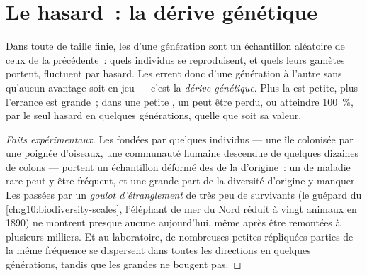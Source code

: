 \section{Le hasard~: la dérive génétique}

\begin{proposition}\label{prop:g12:selection-drift-speciation:drift}
Dans toute  de taille finie, les  d'une génération
sont un échantillon aléatoire de ceux de la précédente~: quels
individus se reproduisent, et quels  leurs gamètes portent,
fluctuent par hasard. Les  errent donc d'une
génération à l'autre sans qu'aucun avantage soit en jeu --- c'est la
\emph{dérive génétique}. Plus la  est
petite, plus l'errance est grande~; dans une petite , un
 peut être perdu, ou atteindre 100~\%, par le seul hasard en
quelques générations, quelle que soit sa valeur.
\end{proposition}
\begin{proof}[Faits expérimentaux]
Les  fondées par quelques individus --- une île colonisée
par une poignée d'oiseaux, une communauté humaine descendue de quelques
dizaines de colons --- portent un échantillon déformé des  de la
 d'origine~: un  de maladie rare peut y être fréquent,
et une grande part de la diversité d'origine y manquer. Les 
passées par un \emph{goulot d'étranglement} de très peu de survivants
(le guépard du \cref{ch:g10:biodiversity-scales}, l'éléphant de mer du
Nord réduit à vingt animaux en 1890) ne montrent presque aucune
 aujourd'hui, même après être remontées à plusieurs
milliers. Et au laboratoire, de nombreuses petites 
répliquées parties de la même fréquence se dispersent dans toutes les
directions en quelques générations, tandis que les grandes ne bougent
pas.
\end{proof}

